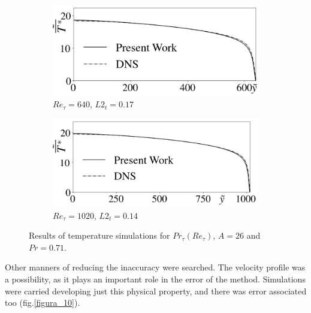 \documentclass[10pt]{article} %
\begin{document}
\begin{figure}[!h]
\begin{subfigure}[t]{0.5\textwidth}
		\centering
		\includegraphics[angle=0, scale=0.24]{fotos_formatacao_final/Temperature_640_071_Prt(Ret)_A26}
		\caption{$Re_\tau = 640$, $L2_t = 0.17$}
	\end{subfigure}
	\begin{subfigure}[t]{0.45\textwidth}
		\centering
		\includegraphics[angle=0, scale=0.24]{fotos_formatacao_final/Temperature_1000_071_Prt(Ret)_A26}
		\caption{$Re_\tau = 1020$, $L2_t = 0.14$}
	\end{subfigure}	
	\caption{Results of temperature simulations for $Pr_\tau(Re_\tau)$, $A = 26$ and $Pr =0.71$. }
	\label{figura_9}
\end{figure}

Other manners of reducing the inaccuracy were searched. The velocity profile was a possibility, as it plays an important role in the error of the method. Simulations were carried developing just this physical property, and there was error associated too (fig.\ref{figura_10}).
\end{document}
